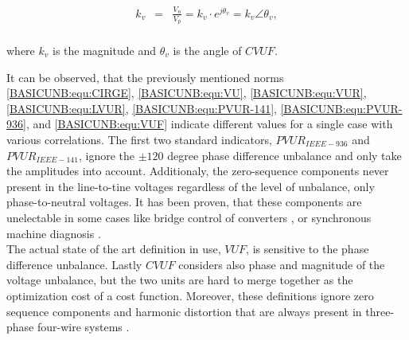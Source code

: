 \begin{equation}
        \begin{array}{rcl}
            k_v&=&\frac{V_n}{V_p}=k_v\cdot e^{j\theta_v}=k_v\angle\theta_v,\\					
        \end{array}
        \label{BASICUNB:equ:CVUF}
    \end{equation}
		
		where $k_v$ is the magnitude and $\theta_v$ is the angle of $CVUF$.
		
			It can be observed, that the previously mentioned norms \ref{BASICUNB:equ:CIRGE}, \ref{BASICUNB:equ:VU}, \ref{BASICUNB:equ:VUR}, \ref{BASICUNB:equ:LVUR}, \ref{BASICUNB:equ:PVUR-141}, \ref{BASICUNB:equ:PVUR-936}, and \ref{BASICUNB:equ:VUF}  indicate different values for a single case with various correlations. The first two standard indicators, $PVUR_{IEEE-936}$ and $PVUR_{IEEE-141}$, ignore the $\pm120$ degree phase difference unbalance and only take the amplitudes into account. Additionaly, the zero-sequence components never present in the line-to-tine voltages regardless of the level of unbalance, only phase-to-neutral voltages. It has been proven, that these components are unelectable in some cases like bridge control of converters \cite{betz2006symmetry}, or synchronous machine diagnosis \cite{hang2015online}.\\
			The actual state of the art definition in use, $VUF$, is sensitive to the phase difference unbalance. Lastly $CVUF$ considers also phase and magnitude of the voltage unbalance, but the two units are hard to merge together as the optimization cost of a cost function. Moreover, these definitions ignore zero sequence components and harmonic distortion that are always present in three-phase four-wire systems \cite{bina2011three}.
		


